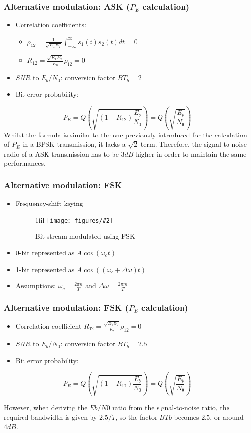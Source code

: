 \documentclass{beamer}
\makeatletter
\newcommand*{\centerfloat}{%
  \parindent \z@
  \leftskip \z@ \@plus 1fil \@minus \textwidth
  \rightskip\leftskip
  \parfillskip \z@skip}
\newcommand{\fig}[3]{
  \begin{figure}[H]
  \centerfloat
    \texttt{[image: figures/\#2]}
    \caption{#3}
  \end{figure}
}
\makeatother
\begin{document}
\begin{frame}
	\frametitle{Alternative modulation: ASK ($P_E$ calculation)}
	\begin{itemize}
		\item Correlation coefficients:
		\begin{itemize}
			\item $\rho_{12} = \frac{1}{\sqrt{E_1 E_2}} \int_{-\infty}^{\infty} s_1(t) s_2(t) dt = 0$
			\item $R_{12} = \frac{\sqrt{E_1 E_2}}{E_b}\rho_{12} = 0$
		\end{itemize}
		\item $SNR$ to $E_b/N_0$: conversion factor $B T_b = 2$
		\item Bit error probability:
	\end{itemize}
	\begin{equation}
		P_E = Q\left(\sqrt{\left(1 - R_{12}\right) \frac{E_b}{N_0}}\right) = Q\left(\sqrt{\frac{E_b}{N_0}}\right)
	\end{equation}
Whilst the formula is similar to the one previously introduced for the
calculation of $P_E$ in a BPSK transmission, it lacks a $\sqrt{2}$ term. Therefore, the signal-to-noise radio of a ASK transmission has to be $3 dB$ higher in order to maintain the same performances.
\end{frame}

\begin{frame}
	\frametitle{Alternative modulation: FSK}
	\begin{itemize}
		\item Frequency-shift keying
		\fig{2.5cm}{fsk.png}{Bit stream modulated using FSK}
		\item 0-bit represented as $A\cos(\omega_c t)$
		\item 1-bit represented as $A\cos((\omega_c + \Delta \omega) t)$
		\item Assumptions: $\omega_c = \frac{2 \pi n}{T}$ and $\Delta\omega = \frac{2 \pi m}{T}$
	\end{itemize}
\end{frame}

\begin{frame}
	\frametitle{Alternative modulation: FSK ($P_E$ calculation)}
	\begin{itemize}
		\item Correlation coefficient $R_{12} = \frac{\sqrt{E_1 E_2}}{E_b}\rho_{12} = 0$
		\item $SNR$ to $E_b/N_0$: conversion factor $B T_b = 2.5$
		\item Bit error probability:
	\end{itemize}
	\begin{equation}
		P_E = Q\left(\sqrt{\left(1 - R_{12}\right) \frac{E_b}{N_0}}\right) = Q\left(\sqrt{\frac{E_b}{N_0}}\right)
	\end{equation}
	
However, when deriving the $Eb/N0$ ratio from the signal-to-noise ratio, the required bandwidth is given by $2.5/T$, so the factor $BTb$ becomes $2.5$, or around $4 dB$.
\end{frame}
\end{document}
